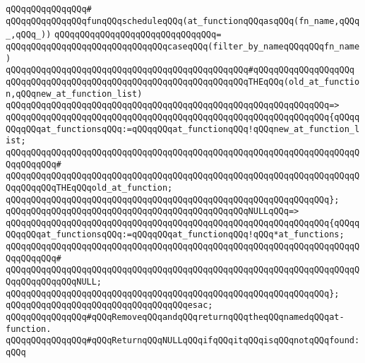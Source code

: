 \verb|qQQqqQQqqQQqqQQq#|\newline
\verb|qQQqqQQqqQQqqQQqfunqQQqscheduleqQQq(at_functionqQQqasqQQq(fn_name,qQQq_,qQQq_))|\newline
\verb|qQQqqQQqqQQqqQQqqQQqqQQqqQQqqQQq=|\newline
\verb|qQQqqQQqqQQqqQQqqQQqqQQqqQQqqQQqcaseqQQq(filter_by_nameqQQqqQQqfn_name)|\newline
\verb|qQQqqQQqqQQqqQQqqQQqqQQqqQQqqQQqqQQqqQQqqQQqqQQq#qQQqqQQqqQQqqQQqqQQq|\newline
\verb|qQQqqQQqqQQqqQQqqQQqqQQqqQQqqQQqqQQqqQQqqQQqqQQqTHEqQQq(old_at_function,qQQqnew_at_function_list)|\newline
\verb|qQQqqQQqqQQqqQQqqQQqqQQqqQQqqQQqqQQqqQQqqQQqqQQqqQQqqQQqqQQqqQQq=>|\newline
\verb|qQQqqQQqqQQqqQQqqQQqqQQqqQQqqQQqqQQqqQQqqQQqqQQqqQQqqQQqqQQqqQQq{qQQqqQQqqQQqat_functionsqQQq:=qQQqqQQqat_functionqQQq!qQQqnew_at_function_list;|\newline
\verb|qQQqqQQqqQQqqQQqqQQqqQQqqQQqqQQqqQQqqQQqqQQqqQQqqQQqqQQqqQQqqQQqqQQqqQQqqQQqqQQq#|\newline
\verb|qQQqqQQqqQQqqQQqqQQqqQQqqQQqqQQqqQQqqQQqqQQqqQQqqQQqqQQqqQQqqQQqqQQqqQQqqQQqqQQqTHEqQQqold_at_function;|\newline
\verb|qQQqqQQqqQQqqQQqqQQqqQQqqQQqqQQqqQQqqQQqqQQqqQQqqQQqqQQqqQQqqQQq};|\newline
\newline
\verb|qQQqqQQqqQQqqQQqqQQqqQQqqQQqqQQqqQQqqQQqqQQqqQQqNULLqQQq=>|\newline
\verb|qQQqqQQqqQQqqQQqqQQqqQQqqQQqqQQqqQQqqQQqqQQqqQQqqQQqqQQqqQQqqQQq{qQQqqQQqqQQqat_functionsqQQq:=qQQqqQQqat_functionqQQq!qQQq*at_functions;|\newline
\verb|qQQqqQQqqQQqqQQqqQQqqQQqqQQqqQQqqQQqqQQqqQQqqQQqqQQqqQQqqQQqqQQqqQQqqQQqqQQqqQQq#|\newline
\verb|qQQqqQQqqQQqqQQqqQQqqQQqqQQqqQQqqQQqqQQqqQQqqQQqqQQqqQQqqQQqqQQqqQQqqQQqqQQqqQQqqQQqNULL;|\newline
\verb|qQQqqQQqqQQqqQQqqQQqqQQqqQQqqQQqqQQqqQQqqQQqqQQqqQQqqQQqqQQqqQQq};|\newline
\verb|qQQqqQQqqQQqqQQqqQQqqQQqqQQqqQQqqQQqesac;|\newline
\newline
\newline
\verb|qQQqqQQqqQQqqQQq#qQQqRemoveqQQqandqQQqreturnqQQqtheqQQqnamedqQQqat-function.|\newline
\verb|qQQqqQQqqQQqqQQq#qQQqReturnqQQqNULLqQQqifqQQqitqQQqisqQQqnotqQQqfound:qQQq|\newline
